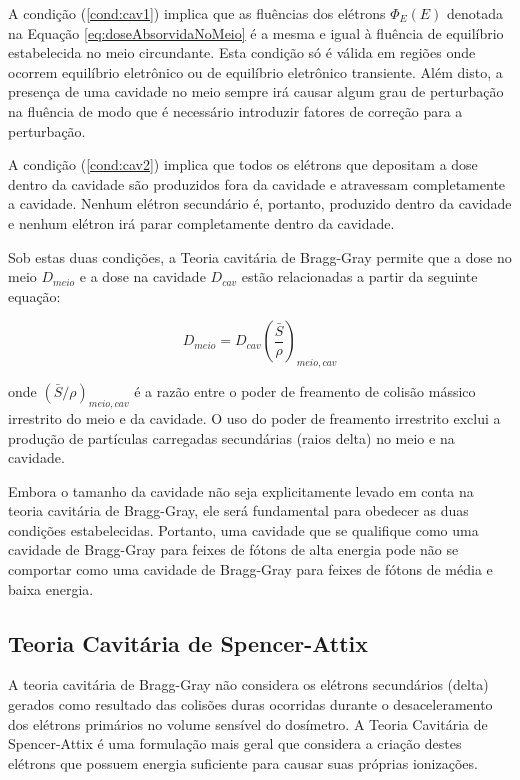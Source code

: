 \documentclass[11pt,a4paper]{article}
\begin{document}
			A condição (\ref{cond:cav1}) implica que as fluências dos elétrons $\Phi_E(E)$ denotada na Equação \ref{eq:doseAbsorvidaNoMeio} é a mesma e  igual à fluência de equilíbrio estabelecida no meio circundante. Esta condição só é válida em regiões onde ocorrem equilíbrio eletrônico ou de equilíbrio eletrônico transiente. Além disto, a presença de uma cavidade no meio sempre irá causar algum grau de perturbação na fluência de modo que é necessário introduzir fatores de correção para a perturbação.

			A condição (\ref{cond:cav2}) implica que todos os elétrons que depositam a dose dentro da cavidade são produzidos fora da cavidade e atravessam completamente a cavidade. Nenhum elétron secundário é, portanto, produzido dentro da cavidade e nenhum elétron irá parar completamente dentro da cavidade. 

			Sob estas duas condições, a Teoria cavitária de Bragg-Gray permite que a dose no meio $D_{meio}$ e a dose na cavidade $D_{cav}$ estão relacionadas a partir da seguinte equação:

				\begin{equation}
					D_{meio} = D_{cav} \left(\frac{\bar{S}}{\rho}\right)_{meio, cav}
				\end{equation}

			\noindent onde $(\bar{S}/\rho)_{meio,cav}$ é a razão entre o poder de freamento de colisão mássico irrestrito do meio e da cavidade. O uso do poder de freamento irrestrito exclui a produção de partículas carregadas secundárias (raios delta) no meio e na cavidade.


			Embora o tamanho da cavidade não seja explicitamente levado em conta na teoria cavitária de Bragg-Gray, ele será fundamental para obedecer as duas condições estabelecidas. Portanto, uma cavidade que se qualifique como uma cavidade de Bragg-Gray para feixes de fótons de alta energia pode não se comportar como uma cavidade de Bragg-Gray para feixes de fótons de média e baixa energia.


		\subsection{Teoria Cavitária de Spencer-Attix}

			A teoria cavitária de Bragg-Gray não considera os elétrons secundários (delta) gerados como resultado das colisões duras ocorridas durante o desaceleramento dos elétrons primários no volume sensível do dosímetro. A Teoria Cavitária de Spencer-Attix é uma formulação mais geral que considera a criação destes elétrons que possuem energia suficiente para causar suas próprias ionizações. 
\end{document}
